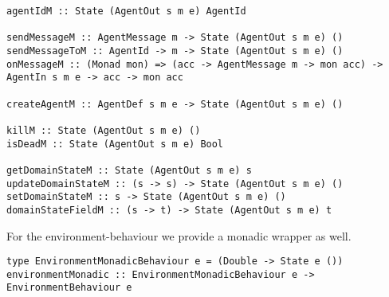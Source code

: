 \begin{verbatim}
agentIdM :: State (AgentOut s m e) AgentId

sendMessageM :: AgentMessage m -> State (AgentOut s m e) ()
sendMessageToM :: AgentId -> m -> State (AgentOut s m e) ()
onMessageM :: (Monad mon) => (acc -> AgentMessage m -> mon acc) -> AgentIn s m e -> acc -> mon acc

createAgentM :: AgentDef s m e -> State (AgentOut s m e) ()

killM :: State (AgentOut s m e) ()
isDeadM :: State (AgentOut s m e) Bool

getDomainStateM :: State (AgentOut s m e) s
updateDomainStateM :: (s -> s) -> State (AgentOut s m e) ()
setDomainStateM :: s -> State (AgentOut s m e) ()
domainStateFieldM :: (s -> t) -> State (AgentOut s m e) t
\end{verbatim}

For the environment-behaviour we provide a monadic wrapper as well.

\begin{verbatim}
type EnvironmentMonadicBehaviour e = (Double -> State e ())
environmentMonadic :: EnvironmentMonadicBehaviour e -> EnvironmentBehaviour e
\end{verbatim}